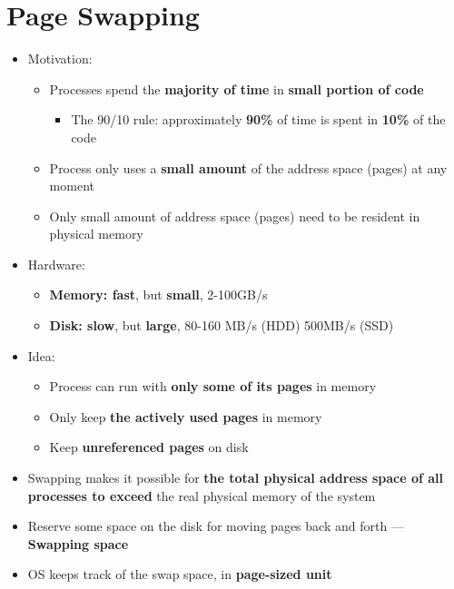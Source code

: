 \documentclass[a4paper,11pt,english]{article}
\begin{document}
\section*{Page Swapping}
\begin{itemize}
    \item Motivation:
        \begin{itemize}
            \item Processes spend the \textbf{\color{blue} majority of time} in \textbf{\color{blue} small portion of code}
                \begin{itemize}
                    \item The 90/10 rule: approximately \textbf{\color{blue} 90\%} of time is spent in \textbf{\color{blue} 10\%} of the code
                \end{itemize}
            \item Process only uses a \textbf{\color{blue} small amount} of the address space (pages) at any moment
            \item Only small amount of address space (pages) need to be resident in physical memory
        \end{itemize}
    \item Hardware:
        \begin{itemize}
            \item \textbf{\color{blue} Memory: fast}, but \textbf{\color{red} small}, 2-100GB/s
            \item \textbf{\color{red} Disk: slow}, but \textbf{\color{blue} large}, 80-160 MB/s (HDD) 500MB/s (SSD)
        \end{itemize}
    \item Idea:
        \begin{itemize}
            \item Process can run with \textbf{\color{blue} only some of its pages} in memory
            \item Only keep \textbf{\color{blue} the actively used pages} in memory
            \item Keep \textbf{\color{red} unreferenced pages} on disk
        \end{itemize}
    \item Swapping makes it possible for \textbf{\color{blue} the total physical address space of all processes to exceed} the real physical memory of the system
    \item Reserve some space on the disk for moving pages back and forth --- \textbf{\color{blue} Swapping space}
    \item OS keeps track of the swap space, in \textbf{\color{orange} page-sized unit} 

\end{itemize}
\end{document}
